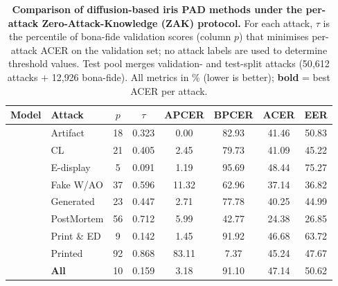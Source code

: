 \begin{table}[!htbp]
\centering
\scriptsize
\setlength{\tabcolsep}{3pt}
\label{tab:diffusion_comparison}
\caption{
\textbf{Comparison of diffusion-based iris PAD methods under the per-attack Zero-Attack-Knowledge (ZAK) protocol.}
For each attack, $\tau$ is the percentile of bona-fide validation scores (column $p$) that minimises per-attack ACER on the validation set; no attack labels are used to determine threshold values.
Test pool merges validation- and test-split attacks (50{,}612 attacks $+$ 12{,}926 bona-fide).
All metrics in \% (lower is better); \textbf{bold} = best ACER per attack.
}

\begin{tabular}{l l c c c c c c}
\toprule
\textbf{Model} & \textbf{Attack} & $p$ & $\tau$ & APCER & BPCER & ACER & EER \\
\midrule

& Artifact       & 18 & 0.323 &   0.00 &  82.93 &                41.46 &          50.83 \\
& CL             & 21 & 0.405 &   2.45 &  79.73 &                41.09 &          45.22 \\
& E-display      &  5 & 0.091 &   1.19 &  95.69 &                48.44 &          75.27 \\
& Fake W/AO      & 37 & 0.596 &  11.32 &  62.96 &                37.14 &          36.82 \\
& Generated      & 23 & 0.447 &   2.71 &  77.78 &                40.25 &          44.99 \\
& PostMortem     & 56 & 0.712 &   5.99 &  42.77 &                24.38 &          26.85 \\
& Print \& ED    &  9 & 0.142 &   1.45 &  91.92 &                46.68 &          63.72 \\
& Printed        & 92 & 0.868 &  83.11 &   7.37 &                45.24 &          47.67 \\
& \textbf{All}  & 10 & 0.159 &   3.18 &  91.10 &                47.14 &          50.62 \\

\midrule


\end{tabular}
\end{table}
